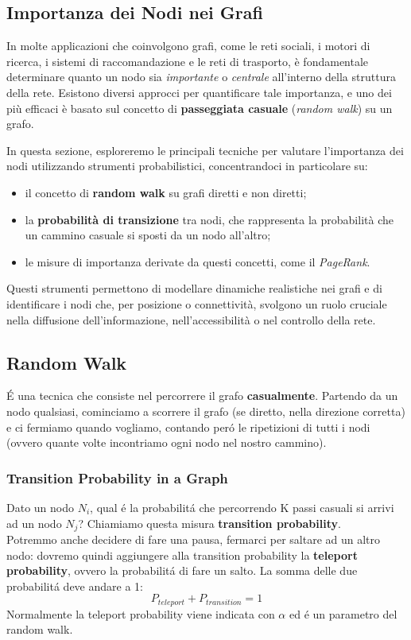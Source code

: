 \subsection{Importanza dei Nodi nei Grafi}

In molte applicazioni che coinvolgono grafi, come le reti sociali, i motori di ricerca, i sistemi di raccomandazione e le reti di trasporto, è fondamentale determinare quanto un nodo sia \textit{importante} o \textit{centrale} all'interno della struttura della rete. Esistono diversi approcci per quantificare tale importanza, e uno dei più efficaci è basato sul concetto di \textbf{passeggiata casuale} (\textit{random walk}) su un grafo.

In questa sezione, esploreremo le principali tecniche per valutare l'importanza dei nodi utilizzando strumenti probabilistici, concentrandoci in particolare su:
\begin{itemize}
    \item il concetto di \textbf{random walk} su grafi diretti e non diretti;
    \item la \textbf{probabilità di transizione} tra nodi, che rappresenta la probabilità che un cammino casuale si sposti da un nodo all'altro;
    \item le misure di importanza derivate da questi concetti, come il \textit{PageRank}.
\end{itemize}

Questi strumenti permettono di modellare dinamiche realistiche nei grafi e di identificare i nodi che, per posizione o connettività, svolgono un ruolo cruciale nella diffusione dell'informazione, nell'accessibilità o nel controllo della rete.

\subsection{Random Walk}
É una tecnica che consiste nel percorrere il grafo \textbf{casualmente}. Partendo da un nodo qualsiasi, cominciamo a scorrere il grafo (se diretto, nella direzione corretta) e ci fermiamo quando vogliamo, contando peró le ripetizioni di tutti i nodi (ovvero quante volte incontriamo ogni nodo nel nostro cammino). 

\subsubsection*{Transition Probability in a Graph}
Dato un nodo $N_i$, qual é la probabilitá che percorrendo K passi casuali si arrivi ad un nodo $N_j$? Chiamiamo questa misura \textbf{transition probability}. 
\\
Potremmo anche decidere di fare una pausa, fermarci per saltare ad un altro nodo: dovremo quindi aggiungere alla transition probability la \textbf{teleport probability}, ovvero la probabilitá di fare un salto. La somma delle due probabilitá deve andare a 1:
\[
P_{teleport} + P_{transition} = 1
\]
Normalmente la teleport probability viene indicata con $\alpha$ ed é un parametro del random walk.  

